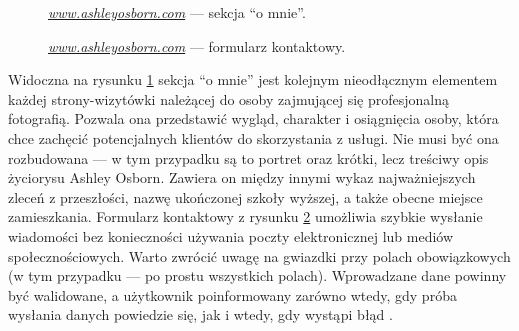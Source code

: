\documentclass[12pt]{article}
\numberwithin{figure}{section}
\begin{document}
\begin{sloppypar}
\begin{figure}[H] 
    \centering
   \caption{\textit{\url{www.ashleyosborn.com}} --- sekcja ``o mnie''.}
   \label{fig:ashley-2.jpg}
\end{figure}

\begin{figure}[H] 
    \centering
   \caption{\textit{\url{www.ashleyosborn.com}} --- formularz kontaktowy.}
   \label{fig:ashley-3.jpg}
\end{figure}

\newpage

Widoczna na rysunku \ref{fig:ashley-2.jpg} sekcja ``o mnie'' jest kolejnym nieodłącznym elementem każdej strony-wizytówki należącej do osoby zajmującej się profesjonalną fotografią. Pozwala ona przedstawić wygląd, charakter i osiągnięcia osoby, która chce zachęcić potencjalnych klientów do skorzystania z usługi. Nie musi być ona rozbudowana --- w tym przypadku są to portret oraz krótki, lecz treściwy opis życiorysu Ashley Osborn. Zawiera on między innymi wykaz najważniejszych zleceń z przeszłości, nazwę ukończonej szkoły wyższej, a także obecne miejsce zamieszkania. Formularz kontaktowy z rysunku \ref{fig:ashley-3.jpg} umożliwia szybkie wysłanie wiadomości bez konieczności używania poczty elektronicznej lub mediów społecznościowych. Warto zwrócić uwagę na gwiazdki przy polach obowiązkowych (w tym przypadku --- po prostu wszystkich polach). Wprowadzane dane powinny być walidowane, a użytkownik poinformowany zarówno wtedy, gdy próba wysłania danych powiedzie się, jak i wtedy, gdy wystąpi błąd \cite{formularze}. 


\end{sloppypar}
\end{document}
